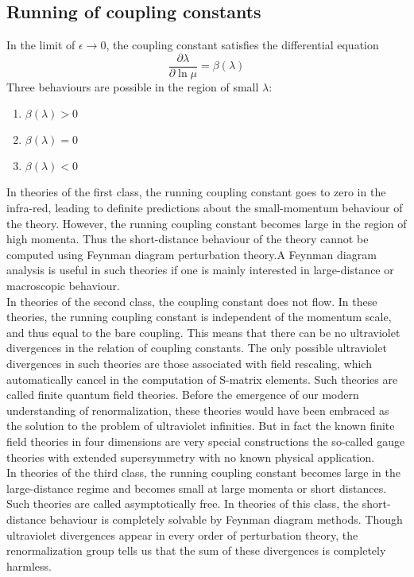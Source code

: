 \documentclass[cyan]{elegantnote}
\begin{document}
\subsection{Running of coupling constants}
In the limit of $\epsilon \to 0$, the coupling constant satisfies the differential equation
\[\frac{\partial \lambda}{\partial \ln \mu} = \beta(\lambda)\]
Three behaviours are possible in the region of small $\lambda$:
\begin{enumerate}
\item $\beta(\lambda) > 0$
\item $\beta(\lambda) = 0$
\item $\beta(\lambda) < 0$
\end{enumerate}
\noindent
In theories of the first class, the running coupling constant goes to zero in the infra-red, leading to definite predictions about the small-momentum behaviour of the theory. However, the running coupling constant becomes large in the region of high momenta. Thus the short-distance behaviour of the theory cannot be computed using Feynman diagram perturbation theory.A Feynman diagram analysis is useful in such theories if one is mainly interested in large-distance or macroscopic behaviour.
\\
In theories of the second class, the coupling constant does not flow. In these theories, the running coupling constant is independent of the momentum scale, and thus equal to the bare coupling. This means that there can be no ultraviolet divergences in the relation of coupling constants. The only possible ultraviolet divergences in such theories are those associated with field rescaling, which automatically cancel in the computation of S-matrix elements. Such theories are called finite quantum field theories. Before the emergence of our modern understanding of renormalization, these theories would have been embraced as the solution to the problem of ultraviolet infinities. But in fact the known finite field theories in four dimensions are very special constructions the so-called gauge theories with extended supersymmetry with no known physical application. 
\\
In theories of the third class, the running coupling constant becomes large in the large-distance regime and becomes small at large momenta or short distances. Such theories are called asymptotically free. In theories of this class, the short-distance behaviour is completely solvable by Feynman diagram methods. Though ultraviolet divergences appear in every order of perturbation theory, the renormalization group tells us that the sum of these divergences is completely harmless.
\end{document}
